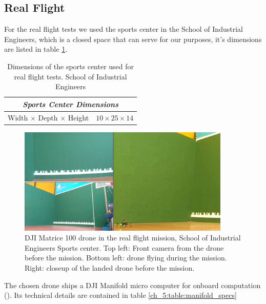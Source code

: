   \subsection{Real Flight} \label{ch_5:subsect:exp_real_flight}

    For the real flight tests we used the sports center in the School of Industrial Engineers, which is a closed space that can serve for our purposes, it's dimensions are listed in table \ref{ch_5:table:sports_dims}.

    \begin{table}[!h]
      \centering
      \begin{tabular}{lr} \toprule
        \multicolumn{2}{c}{\textit{Sports Center Dimensions}}        \\ \midrule
        Width $\times$ Depth $\times$ Height & $10 \times 25 \times 14$ \\ \bottomrule
        \hline
      \end{tabular}
      \caption{Dimensions of the sports center used for real flight tests. School of Industrial Engineers}
      \label{ch_5:table:sports_dims}
    \end{table}

    \begin{figure}
      \centering
      \includegraphics[width=0.9\textwidth,height=0.5\textheight,keepaspectratio]{./Figures/RealFlight.png}
      \caption{DJI Matrice 100 drone in the real flight mission, School of Industrial Engineers Sports center. Top left: Front camera from the drone before the mission. Bottom left: drone flying during the mission. Right: closeup of the landed drone before the mission.}
      \label{ch_5:fig:full_realflight}
    \end{figure}

    The chosen drone ships a DJI Manifold micro computer for onboard computation (\cite{dji_manifold_web}). Its technical details are contained in table \ref{ch_5:table:manifold_specs}

